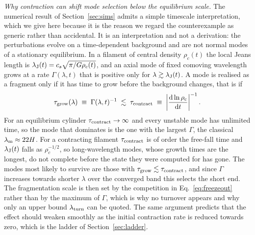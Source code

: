 \documentclass[usenatbib,twoside,twocolumn]{mnras}
\begin{document}
\emph{Why contraction can shift mode selection below the equilibrium scale.} The numerical result of Section~\ref{sec:sims} admits a simple timescale interpretation, which we give here because it is the reason we regard the counterexample as generic rather than accidental. It is an interpretation and not a derivation: the perturbations evolve on a time-dependent background and are not normal modes of a stationary equilibrium. In a filament of central density $\rho_c(t)$ the local Jeans length is $\lambda_{\rm J}(t)=c_s\sqrt{\pi/G\rho_c(t)}$, and an axial mode of fixed comoving wavelength grows at a rate $\Gamma(\lambda,t)$ that is positive only for $\lambda\gtrsim\lambda_{\rm J}(t)$. A mode is realised as a fragment only if it has time to grow before the background changes, that is if
\begin{equation}
\tau_{\rm grow}(\lambda)\;\equiv\;\Gamma(\lambda,t)^{-1}\;\lesssim\;\tau_{\rm contract}\;\equiv\;\left|\frac{\rm d\ln\rho_c}{{\rm d}t}\right|^{-1}.
\label{eq:freezeout}
\end{equation}
For an equilibrium cylinder $\tau_{\rm contract}\to\infty$ and every unstable mode has unlimited time, so the mode that dominates is the one with the largest $\Gamma$, the classical $\lambda_{\rm m}\approx22H$. For a contracting filament $\tau_{\rm contract}$ is of order the free-fall time and $\lambda_{\rm J}(t)$ falls as $\rho_c^{-1/2}$, so long-wavelength modes, whose growth times are the longest, do not complete before the state they were computed for has gone. The modes most likely to survive are those with $\tau_{\rm grow}\lesssim\tau_{\rm contract}$, and since $\Gamma$ increases towards shorter $\lambda$ over the converged band this selects the short end. The fragmentation scale is then set by the competition in Eq.~\ref{eq:freezeout} rather than by the maximum of $\Gamma$, which is why no turnover appears and why only an upper bound $\lambda_{\rm turn}$ can be quoted. The same argument predicts that the effect should weaken smoothly as the initial contraction rate is reduced towards zero, which is the ladder of Section~\ref{sec:ladder}.




\bsp
\label{lastpage}
\end{document}

